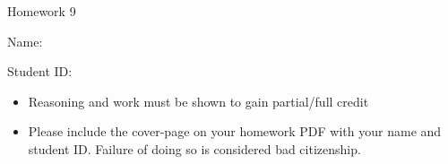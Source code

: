 \documentclass[11pt]{exam}
\begin{document}
\centerline{\Large \sc Homework 9}
\pagestyle{empty}

\hrulefill

\vspace{2cm}


{\Large \sc Name:}



\vspace{2cm}



{\Large \sc Student ID:}

\vspace{6cm}

\begin{itemize}
  \item Reasoning and work must be shown to gain partial/full
  credit
  \item Please include the cover-page on your homework PDF with your name and student ID. Failure of doing so is considered bad citizenship. 

 \end{itemize}

\clearpage
\end{document}
